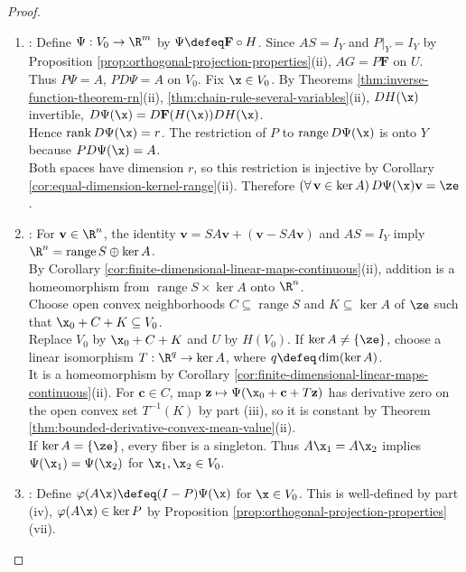 \begin{theorem}
\begin{proof}
\begin{enumerate}[label=(\roman*)]
Since $DG(\a)=I$, choose open neighborhoods $U\ni\a$ and $V_0\ni\x_0\defeq G(\a)$ such that $G:U\to V_0$ is a $C^1$ diffeomorphism by Theorem \ref{thm:inverse-function-theorem-rn}(i),(iii); set $H\defeq G^{-1}$.
\item {}: Define $\Psi:V_0\to\R^m$ by $\Psi\defeq\mathbf{F}\circ H$. Since $AS=I_Y$ and $P|_Y=I_Y$ by Proposition \ref{prop:orthogonal-projection-properties}(ii), $AG=P\mathbf{F}$ on $U$.\\
Thus $P\Psi=A$, $PD\Psi=A$ on $V_0$. Fix $\x\in V_0$. By Theorems \ref{thm:inverse-function-theorem-rn}(ii), \ref{thm:chain-rule-several-variables}(ii), $DH(\x)$  invertible, $D\Psi(\x)=D\mathbf{F}(H(\x))DH(\x)$.\\
Hence $\operatorname{rank}D\Psi(\x)=r$. The restriction of $P$ to $\operatorname{range}D\Psi(\x)$ is onto $Y$ because $PD\Psi(\x)=A$.\\
Both spaces have dimension $r$, so this restriction is injective by Corollary \ref{cor:equal-dimension-kernel-range}(ii). Therefore $(\forall\,\mathbf{v}\in\ker A)\,D\Psi(\x)\mathbf{v}=\ze$.
\item {}: For $\mathbf{v}\in\R^n$, the identity $\mathbf{v}=SA\mathbf{v}+(\mathbf{v}-SA\mathbf{v})$ and $AS=I_Y$ imply $\R^n=\operatorname{range}S\oplus\ker A$.\\
By Corollary \ref{cor:finite-dimensional-linear-maps-continuous}(ii), addition is a homeomorphism from $\operatorname{range}S\times\ker A$ onto $\R^n$.\\
Choose open convex neighborhoods $C\subseteq\operatorname{range}S$ and $K\subseteq\ker A$ of $\ze$ such that $\x_0+C+K\subseteq V_0$.\\
Replace $V_0$ by $\x_0+C+K$ and $U$ by $H(V_0)$. If $\ker A\neq\{\ze\}$, choose a linear isomorphism $T:\R^q\to\ker A$, where $q\defeq\dim(\ker A)$.\\
It is a homeomorphism by Corollary \ref{cor:finite-dimensional-linear-maps-continuous}(ii). For $\mathbf{c}\in C$, map $\mathbf{z}\mapsto\Psi(\x_0+\mathbf{c}+T\mathbf{z})$ has derivative zero on the open convex set $T^{-1}(K)$ by part (iii), so it is constant by Theorem \ref{thm:bounded-derivative-convex-mean-value}(ii).\\
If $\ker A=\{\ze\}$, every fiber is a singleton. Thus $A\x_1=A\x_2$ implies $\Psi(\x_1)=\Psi(\x_2)$ for $\x_1,\x_2\in V_0$.
\item {}: Define $\varphi(A\x)\defeq(I-P)\Psi(\x)$ for $\x\in V_0$. This is well-defined by part (iv), $\varphi(A\x)\in\ker P$ by Proposition \ref{prop:orthogonal-projection-properties}(vii).\\

\end{enumerate}
\end{proof}
\end{theorem}
